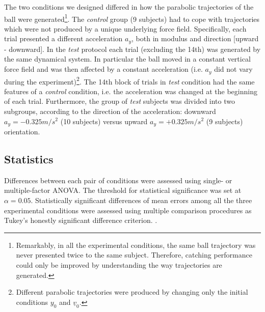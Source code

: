 The two conditions we designed differed in how the parabolic trajectories of the ball were generated\footnote{Remarkably, in all the experimental conditions, the same ball trajectory was never presented twice to the same subject. Therefore, catching performance could only be improved by understanding the way trajectories are generated.}. The \textit{control} group (9 subjects) had to cope with trajectories which were not produced by a unique underlying force field. Specifically, each trial presented a different acceleration $a_y$, both in modulus and direction [upward - downward]. In the \textit{test} protocol each trial (excluding the 14th) was generated by the same dynamical system. In particular the ball moved in a constant vertical force field and was then affected by a constant acceleration (i.e. $a_y$ did not vary during the experiment)\footnote{Different parabolic trajectories were produced by changing only the initial conditions $y_0$ and $\underline{v}_0$.}. The 14th block of trials in \textit{test} condition had the same features of a \textit{control} condition, i.e. the acceleration was changed at the beginning of each trial. Furthermore, the group of \textit{test} subjects was divided into two subgroups, according to the direction of the acceleration: downward $a_y=-0.325 m/{s^2}$ (10 subjects) versus upward $a_y=+0.325 m/{s^2}$ (9 subjects) orientation.

\subsection{Statistics}
Differences between each pair of conditions were assessed using single- or multiple-factor
ANOVA. The threshold for statistical significance was set at $\alpha =
0.05$. Statistically significant differences of mean errors among all the three
experimental conditions were assessed using multiple comparison procedures as Tukey's honestly significant difference criterion. \citep{Hochberg}.
